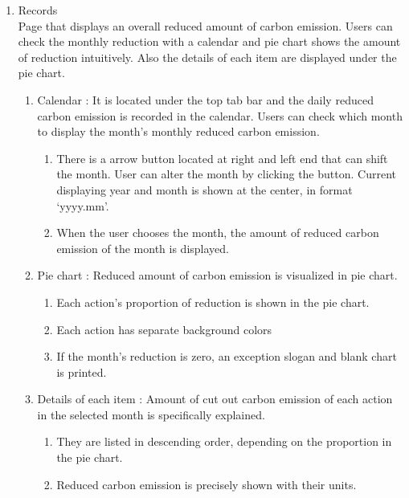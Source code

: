 \documentclass[11pt, conference]{IEEEtran}
\begin{document}
\begin{enumerate}[label=\arabic*]
    \item {\large{Records}}\\
    Page that displays an overall reduced amount of carbon emission. Users can check the monthly reduction with a calendar and pie chart shows the amount of reduction intuitively. Also the details of each item are displayed under the pie chart.
    \begin{enumerate}[label=\alph*]
        \item Calendar : It is located under the top tab bar and the daily reduced carbon emission is recorded in the calendar. Users can check which month to display the month’s monthly reduced carbon emission.
        \begin{enumerate}
            \item There is a arrow button located at right and left end that can shift the month. User can alter the month by clicking the button. Current displaying year and month is shown at the center, in format ‘yyyy.mm’.
            \item When the user chooses the month, the amount of reduced carbon emission of the month is displayed. 
        \end{enumerate}
        \item Pie chart : Reduced amount of carbon emission is visualized in pie chart.
        \begin{enumerate}
            \item Each action’s proportion of reduction is shown in the pie chart.
            \item Each action has separate background colors
            \item If the month’s reduction is zero, an exception slogan and blank chart is printed.
        \end{enumerate}
        \item Details of each item : Amount of cut out carbon emission of each action in the selected month is specifically explained.
        \begin{enumerate}
            \item They are listed in descending order, depending on the proportion in the pie chart.
            \item Reduced carbon emission is precisely shown with their units.\\
        \end{enumerate}
    \end{enumerate}
    

\end{enumerate}
\end{document}
